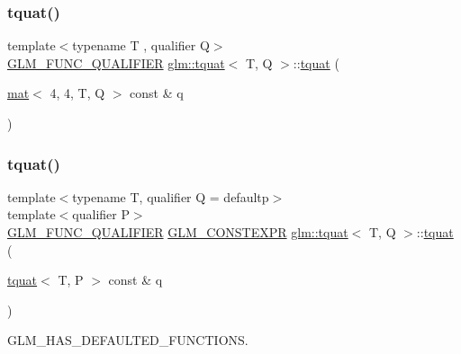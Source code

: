 \subsubsection{\texorpdfstring{tquat()}{tquat()}\hspace{0.1cm}{\footnotesize\ttfamily [10/12]}}
{\footnotesize\ttfamily template$<$typename T , qualifier Q$>$ \\
\mbox{\hyperlink{setup_8hpp_a33fdea6f91c5f834105f7415e2a64407}{G\+L\+M\+\_\+\+F\+U\+N\+C\+\_\+\+Q\+U\+A\+L\+I\+F\+I\+ER}} \mbox{\hyperlink{structglm_1_1tquat}{glm\+::tquat}}$<$ T, Q $>$\+::\mbox{\hyperlink{structglm_1_1tquat}{tquat}} (\begin{DoxyParamCaption}\item[{\mbox{\hyperlink{structglm_1_1mat}{mat}}$<$ 4, 4, T, Q $>$ const \&}]{q }\end{DoxyParamCaption})}

\mbox{\label{structglm_1_1tquat_ab59e0622b75684ae91e699d2f4b41cef}} 
\subsubsection{\texorpdfstring{tquat()}{tquat()}\hspace{0.1cm}{\footnotesize\ttfamily [11/12]}}
{\footnotesize\ttfamily template$<$typename T, qualifier Q = defaultp$>$ \\
template$<$qualifier P$>$ \\
\mbox{\hyperlink{setup_8hpp_a33fdea6f91c5f834105f7415e2a64407}{G\+L\+M\+\_\+\+F\+U\+N\+C\+\_\+\+Q\+U\+A\+L\+I\+F\+I\+ER}} \mbox{\hyperlink{setup_8hpp_a08b807947b47031d3a511f03f89645ad}{G\+L\+M\+\_\+\+C\+O\+N\+S\+T\+E\+X\+PR}} \mbox{\hyperlink{structglm_1_1tquat}{glm\+::tquat}}$<$ T, Q $>$\+::\mbox{\hyperlink{structglm_1_1tquat}{tquat}} (\begin{DoxyParamCaption}\item[{\mbox{\hyperlink{structglm_1_1tquat}{tquat}}$<$ T, P $>$ const \&}]{q }\end{DoxyParamCaption})}



G\+L\+M\+\_\+\+H\+A\+S\+\_\+\+D\+E\+F\+A\+U\+L\+T\+E\+D\+\_\+\+F\+U\+N\+C\+T\+I\+O\+NS. 

\mbox{\label{structglm_1_1tquat_a7646314c6d0f3d3f4df1e940e3181baa}} 
